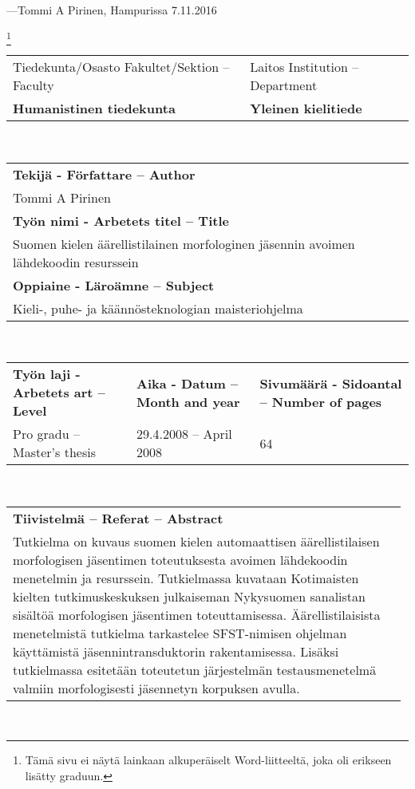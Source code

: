 \documentclass[free]{flammie}
\begin{document}
---Tommi A Pirinen, Hampurissa 7.11.2016


\newpage

\footnote{Tämä sivu ei näytä lainkaan alkuperäiselt Word-liitteeltä, joka oli
erikseen lisätty graduun.}

\begin{tabular}{|l|l|}
\hline
Tiedekunta/Osasto Fakultet/Sektion – Faculty &
Laitos Institution – Department \\
\bf Humanistinen tiedekunta & \bf Yleinen kielitiede \\
\hline
\end{tabular}\\
\begin{tabular}{|l|}
\hline
\bf Tekijä - Författare – Author \\
Tommi A Pirinen \\
\hline
\bf Työn nimi - Arbetets titel – Title \\
Suomen kielen äärellistilainen morfologinen jäsennin avoimen lähdekoodin
resurssein \\
\hline
\bf Oppiaine - Läroämne – Subject \\
Kieli-, puhe- ja käännösteknologian maisteriohjelma \\
\hline
\end{tabular}\\
\begin{tabular}{|l|l|l|}
    \hline
    \bf Työn laji - Arbetets art – Level &
    \bf Aika - Datum – Month and year &
    \bf Sivumäärä - Sidoantal – Number of pages \\
    Pro gradu – Master’s thesis &
    29.4.2008 – April 2008 &
    64 \\
    \hline
\end{tabular}\\
\begin{tabular}{|p{0.98\linewidth}|}
    \hline
    \bf Tiivistelmä – Referat – Abstract \\
    Tutkielma on kuvaus suomen kielen automaattisen äärellistilaisen morfologisen
    jäsentimen toteutuksesta avoimen lähdekoodin menetelmin ja resurssein.
    Tutkielmassa kuvataan Kotimaisten kielten tutkimuskeskuksen julkaiseman
    Nykysuomen sanalistan sisältöä morfologisen jäsentimen toteuttamisessa.
    Äärellistilaisista menetelmistä tutkielma tarkastelee SFST-nimisen ohjelman
    käyttämistä jäsennintransduktorin rakentamisessa. Lisäksi tutkielmassa
    esitetään toteutetun järjestelmän testausmenetelmä valmiin morfologisesti
    jäsennetyn korpuksen avulla. \\
    \hline
\end{tabular}\\
\end{document}
